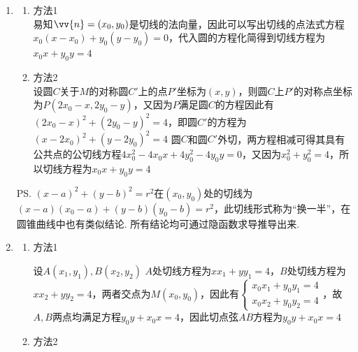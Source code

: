 \begin{enumerate}
\begin{enumerate}
    \end{enumerate}
    \begin{jieda}
        \begin{enumerate}
            \item 
            \begin{enumerate}
                \item 方法1 \\
                易知$\vv{n} = (x_0, y_0)$是切线的法向量，因此可以写出切线的点法式方程$x_0(x-x_0) + y_0(y-y_0) = 0$，代入圆的方程化简得到切线方程为$x_0x+y_0y = 4$ 
                \item 方法2 \\
                设圆$C$关于$M$的对称圆$C'$上的点$P'$坐标为$(x, y)$，则圆$C$上$P'$的对称点坐标为$P(2x_0 - x, 2y_0-y)$，又因为$P$满足圆$C$的方程因此有$(2x_0 - x)^2+(2y_0 - y)^2 = 4$，即圆$C'$的方程为$(x-2x_0)^2+(y-2y_0)^2 = 4$
                圆$C$和圆$C'$外切，两方程相减可得其具有公共点的公切线方程$4x_0^2-4x_0x+4y_0^2-4y_0y = 0$，又因为$x_0^2+y_0^2 = 4$，所以切线方程为$x_0x+y_0y = 4$ 
            \end{enumerate}
            \ps $(x-a)^2+(y-b)^2 = r^2$在$(x_0, y_0)$处的切线为$(x-a)(x_0-a) + (y-b)(y_0-b) = r^2$，此切线形式称为“换一半”，在圆锥曲线中也有类似结论. 所有结论均可通过隐函数求导推导出来.
            \item 
            \begin{enumerate}
                \item 方法1 
                
                设$A(x_1, y_1), B(x_2, y_2)$
                $A$处切线方程为$xx_1+yy_1 = 4$，$B$处切线方程为$xx_2+yy_2 = 4$，两者交点为$M(x_0, y_0)$，因此有$\left\{\begin{array}{l}
                         x_0x_1+y_0y_1 = 4 \\
                         x_0x_2+y_0y_2 = 4
                \end{array}\right.$，故$A, B$两点均满足方程$y_0y+x_0x = 4$，因此切点弦$AB$方程为$y_0y+x_0x = 4$
                \item 方法2


\end{enumerate}
\end{enumerate}
\end{jieda}
\end{enumerate}
